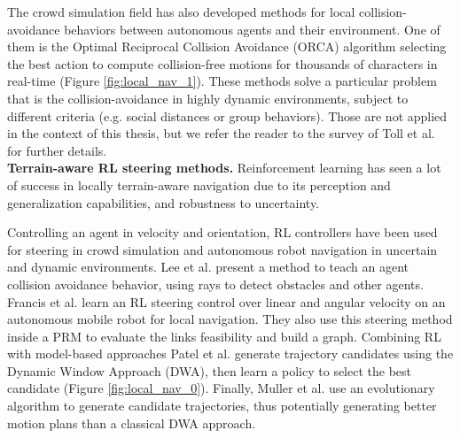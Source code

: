The crowd simulation field has also developed methods for local collision-avoidance behaviors between autonomous agents and their environment. One of them is the Optimal Reciprocal Collision Avoidance (ORCA) algorithm \cite{orca_2011} selecting the best action to compute collision-free motions for thousands of characters in real-time (Figure \ref{fig:local_nav_1}). 
These methods solve a particular problem that is the collision-avoidance in highly dynamic environments, subject to different criteria (e.g. social distances or group behaviors). Those are not applied in the context of this thesis, but we refer the reader to the survey of Toll et al. \cite{vantoll_microscopic_crowd_2021} for further details.\\


\noindent\textbf{Terrain-aware RL steering methods.}
Reinforcement learning has seen a lot of success in locally terrain-aware navigation due to its perception and generalization capabilities, and robustness to uncertainty.

Controlling an agent in velocity and orientation, RL controllers have been used for steering in crowd simulation \cite{survey_rl_animation_pettre_2022} and autonomous robot navigation \cite{collision_avoidance_rl_multiagent_chen_2016, survey_rl_driving_kiran_2020} in uncertain and dynamic environments.
Lee et al. \cite{jaedong_2018_crowd_rl} present a method to teach an agent collision avoidance behavior, using rays to detect obstacles and other agents.
Francis et al. \cite{prm_rl_2019} learn an RL steering control over linear and angular velocity on an autonomous mobile robot for local navigation. They also use this steering method inside a PRM to evaluate the links feasibility and build a graph.
Combining RL with model-based approaches Patel et al. \cite{patel_dwa_rl_2021} generate trajectory candidates using the Dynamic Window Approach (DWA), then learn a policy to select the best candidate (Figure \ref{fig:local_nav_0}).
Finally, Muller et al. \cite{dwa_gan} use an evolutionary algorithm to generate candidate trajectories, thus potentially generating better motion plans than a classical DWA approach.

